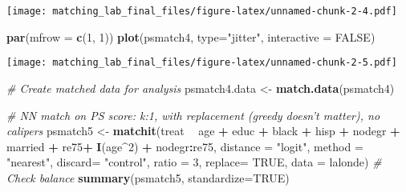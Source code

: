 \documentclass[]{article}
\newenvironment{Shaded}{\begin{snugshade}}{\end{snugshade}}
\newcommand{\CommentTok}[1]{\textcolor[rgb]{0.56,0.35,0.01}{\textit{#1}}}
\newcommand{\DataTypeTok}[1]{\textcolor[rgb]{0.13,0.29,0.53}{#1}}
\newcommand{\DecValTok}[1]{\textcolor[rgb]{0.00,0.00,0.81}{#1}}
\newcommand{\KeywordTok}[1]{\textcolor[rgb]{0.13,0.29,0.53}{\textbf{#1}}}
\newcommand{\NormalTok}[1]{#1}
\newcommand{\OperatorTok}[1]{\textcolor[rgb]{0.81,0.36,0.00}{\textbf{#1}}}
\newcommand{\OtherTok}[1]{\textcolor[rgb]{0.56,0.35,0.01}{#1}}
\newcommand{\StringTok}[1]{\textcolor[rgb]{0.31,0.60,0.02}{#1}}
\begin{document}
\texttt{[image: matching\_lab\_final\_files/figure-latex/unnamed-chunk-2-4.pdf]}

\begin{Shaded}
\begin{Highlighting}[]
\KeywordTok{par}\NormalTok{(}\DataTypeTok{mfrow =} \KeywordTok{c}\NormalTok{(}\DecValTok{1}\NormalTok{, }\DecValTok{1}\NormalTok{))}
\KeywordTok{plot}\NormalTok{(psmatch4, }\DataTypeTok{type=}\StringTok{"jitter"}\NormalTok{, }\DataTypeTok{interactive =} \OtherTok{FALSE}\NormalTok{)}
\end{Highlighting}
\end{Shaded}

\texttt{[image: matching\_lab\_final\_files/figure-latex/unnamed-chunk-2-5.pdf]}

\begin{Shaded}
\begin{Highlighting}[]
\CommentTok{# Create matched data for analysis}
\NormalTok{psmatch4.data <-}\StringTok{ }\KeywordTok{match.data}\NormalTok{(psmatch4)}

\CommentTok{# NN match on PS score: k:1, with replacement (greedy doesn't matter), no calipers}
\NormalTok{psmatch5 <-}\StringTok{ }\KeywordTok{matchit}\NormalTok{(treat }\OperatorTok{~}\StringTok{ }\NormalTok{age }\OperatorTok{+}\StringTok{ }\NormalTok{educ }\OperatorTok{+}\StringTok{ }\NormalTok{black }\OperatorTok{+}\StringTok{ }\NormalTok{hisp }\OperatorTok{+}\StringTok{ }\NormalTok{nodegr }\OperatorTok{+}\StringTok{ }\NormalTok{married }\OperatorTok{+}\StringTok{ }\NormalTok{re75}\OperatorTok{+}\StringTok{ }\KeywordTok{I}\NormalTok{(age}\OperatorTok{^}\DecValTok{2}\NormalTok{) }\OperatorTok{+}\StringTok{ }\NormalTok{nodegr}\OperatorTok{:}\NormalTok{re75, }
                    \DataTypeTok{distance =} \StringTok{"logit"}\NormalTok{, }\DataTypeTok{method =} \StringTok{"nearest"}\NormalTok{, }\DataTypeTok{discard=} \StringTok{"control"}\NormalTok{, }
                    \DataTypeTok{ratio =} \DecValTok{3}\NormalTok{, }\DataTypeTok{replace=} \OtherTok{TRUE}\NormalTok{, }\DataTypeTok{data =}\NormalTok{ lalonde)}
\CommentTok{# Check balance}
\KeywordTok{summary}\NormalTok{(psmatch5, }\DataTypeTok{standardize=}\OtherTok{TRUE}\NormalTok{)}
\end{Highlighting}
\end{Shaded}
\end{document}
